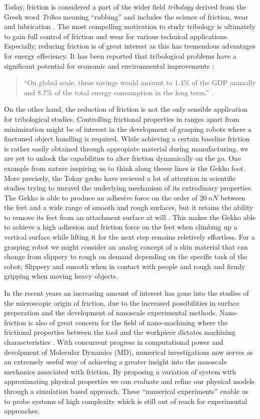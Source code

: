 Today, friction is considered a part of the wider field \textit{tribology}
derived from the Greek word \textit{Tribos} meaning ``rubbing'' and includes the
science of friction, wear and lubrication \cite{bhushan_2013}. The most
compelling motivation to study tribology is ultimately to gain full control of
friction and wear for various technical applications. Especially, reducing
friction is of great interest as this has tremendous advantages for energy
effeciency. It has been reported that tribological problems have a significant
potential for economic and environmental improvements
\cite{kim_nano-scale_2009}:
\begin{quote}
    ``On global scale, these savings would amount to 1.4\% of the GDP annually
    and 8.7\% of the total energy consumption in the long term.''
    \cite{holmberg_influence_2017}. 
\end{quote}
On the other hand, the reduction of friction is not the only sensible
application for tribological studies. Controlling frictional properties in ranges apart from minimization might be
of interest in the development of grasping robots where a finetuned object
handling is required. While achieving a certain baseline friction is rather easily obtained through appropiate material during manufacturing, we are yet to unlock the capabilities to
alter friction dynamically on the go. One example from nature inspiring us to think along theese lines is the Gekko foot. More precisely, the Tokay gecko have recieved a lot
of attention in scientific studies trying to unravel the underlying mechanism
of its extrodinary properties. The Gekko is able to produce an
adhesive force on the order of $\SI{20}{nN}$ between the feet and a wide range of smooth and rough surfaces, but it retains the ability to remove
its feet from an attachment surface at will \cite{Gekko}. This makes the Gekko
able to achieve a high adhesion and friction force on the feet when climbing up a vertical surface while lifting it for the next step remains reletively effortless. For a grasping robot we might consider an analog concept of a skin material that can change
from slippery to rough on demand depending on the specific task of the robot; Slippery and smooth when in contact with people and rough and firmly gripping when moving heavy objects.

In the recent years an increasing amount of interest has gone into the studies of the microscopic origin of friction, due to the increased
possibilities in surface preperation and the development of nanoscale
experimental methods. Nano-friction is also of great concern for the field of
nano-machining where the frictional properties between the tool and the
workpiece dictates machining charascteristics \cite{kim_nano-scale_2009}. With concurrent progress in computational power and devolpment of Molecular Dynamics
(\acrshort{MD}), numerical investigations now serves as an extremely useful way of
achieving a greater insight into the nanoscale mechanics associated with
friction. By proposing a variation of system with approximating physical properties we can evaluate and refine our physical models through a simulation based approach. These ``numerical experiments'' enable us to probe systems of high complexity which is still out of reach for experimental approaches.


